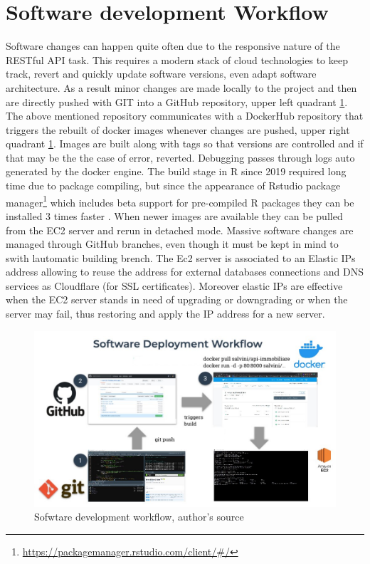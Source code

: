 \documentclass[
  12pt,
  a4paper,
  oneside]{book}
\DeclareRobustCommand{\href}[2]{#2\footnote{\url{#1}}}
\theoremstyle{definition}
\theoremstyle{definition}
\theoremstyle{definition}
\theoremstyle{remark}
\begin{document}
\hypertarget{sdwf}{%
\section{Software development Workflow}\label{sdwf}}

Software changes can happen quite often due to the responsive nature of the RESTful API task. This requires a modern stack of cloud technologies to keep track, revert and quickly update software versions, even adapt software architecture. As a result minor changes are made locally to the project and then are directly pushed with GIT into a GitHub repository, upper left quadrant \ref{fig:sfmap}. The above mentioned repository communicates with a DockerHub repository that triggers the rebuilt of docker images whenever changes are pushed, upper right quadrant \ref{fig:sfmap}. Images are built along with tags so that versions are controlled and if that may be the the case of error, reverted. Debugging passes through logs auto generated by the docker engine. The build stage in R since 2019 required long time due to package compiling, but since the appearance of Rstudio \href{https://packagemanager.rstudio.com/client/\#/}{package manager} which includes beta support for pre-compiled R packages they can be installed 3 times faster \citep{nolispmanager}.
When newer images are available they can be pulled from the EC2 server and rerun in detached mode. Massive software changes are managed through GitHub branches, even though it must be kept in mind to swith lautomatic building brench. The Ec2 server is associated to an Elastic IPs address allowing to reuse the address for external databases connections and DNS services as Cloudflare (for SSL certificates). Moreover elastic IPs are effective when the EC2 server stands in need of upgrading or downgrading or when the server may fail, thus restoring and apply the IP address for a new server.

\begin{figure}
\centering
\includegraphics{images/SoftwareDevWF.jpg}
\caption{\label{fig:sfmap}Sofwtare development workflow, author's source}
\end{figure}
\end{document}
